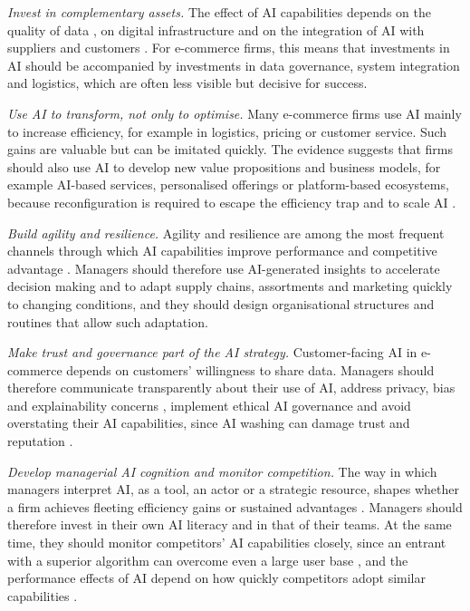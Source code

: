 \emph{Invest in complementary assets.} The effect of AI capabilities depends on the quality of data \parencite[1]{slrR050}, on digital infrastructure \parencite[1]{slrR111} and on the integration of AI with suppliers and customers \parencite[1]{slrR083}. For e-commerce firms, this means that investments in AI should be accompanied by investments in data governance, system integration and logistics, which are often less visible but decisive for success.

\emph{Use AI to transform, not only to optimise.} Many e-commerce firms use AI mainly to increase efficiency, for example in logistics, pricing or customer service. Such gains are valuable but can be imitated quickly. The evidence suggests that firms should also use AI to develop new value propositions and business models, for example AI-based services, personalised offerings or platform-based ecosystems, because reconfiguration is required to escape the efficiency trap \parencite[1]{huang2026} and to scale AI \parencite[574]{sjodin2021}.

\emph{Build agility and resilience.} Agility and resilience are among the most frequent channels through which AI capabilities improve performance and competitive advantage \parencites[1]{fossowamba2022}[1]{wang2026}. Managers should therefore use AI-generated insights to accelerate decision making and to adapt supply chains, assortments and marketing quickly to changing conditions, and they should design organisational structures and routines that allow such adaptation.

\emph{Make trust and governance part of the AI strategy.} Customer-facing AI in e-commerce depends on customers' willingness to share data. Managers should therefore communicate transparently about their use of AI, address privacy, bias and explainability concerns \parencite[1]{slrR133}, implement ethical AI governance \parencite[2227]{slrR043} and avoid overstating their AI capabilities, since AI washing can damage trust and reputation \parencite[519]{slrR148}.

\emph{Develop managerial AI cognition and monitor competition.} The way in which managers interpret AI, as a tool, an actor or a strategic resource, shapes whether a firm achieves fleeting efficiency gains or sustained advantages \parencite[1]{wu2026}. Managers should therefore invest in their own AI literacy and in that of their teams. At the same time, they should monitor competitors' AI capabilities closely, since an entrant with a superior algorithm can overcome even a large user base \parencite[187]{chen2026}, and the performance effects of AI depend on how quickly competitors adopt similar capabilities \parencite[322]{slrR129}.

